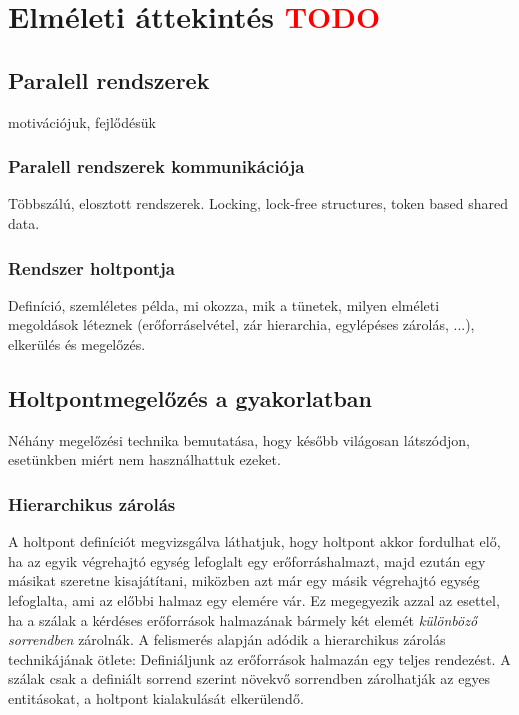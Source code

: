 \chapter{Elméleti áttekintés \textcolor{red}{TODO}}

\section{Paralell rendszerek} motivációjuk, fejlődésük %
    \subsection{Paralell rendszerek kommunikációja} 
        Többszálú, elosztott rendszerek. Locking, lock-free structures, token based shared data.
    \subsection{Rendszer holtpontja} Definíció, szemléletes példa, mi okozza, mik a tünetek, milyen elméleti megoldások léteznek (erőforráselvétel, zár hierarchia, egylépéses zárolás, ...), elkerülés és megelőzés.

\section{Holtpontmegelőzés a gyakorlatban} Néhány megelőzési technika bemutatása, hogy később világosan látszódjon, esetünkben miért nem használhattuk ezeket.

    \subsection{Hierarchikus zárolás} 
    A holtpont definíciót megvizsgálva láthatjuk, hogy holtpont akkor fordulhat elő, ha az egyik végrehajtó egység lefoglalt egy erőforráshalmazt, majd ezután egy másikat szeretne kisajátítani, miközben azt már egy másik végrehajtó egység lefoglalta, ami az előbbi halmaz egy elemére vár. Ez megegyezik azzal az esettel, ha a szálak a kérdéses erőforrások halmazának bármely két elemét \emph{különböző sorrendben} zárolnák. A felismerés alapján adódik a hierarchikus zárolás technikájának ötlete: Definiáljunk az erőforrások halmazán egy teljes rendezést. A szálak csak a definiált sorrend szerint növekvő sorrendben zárolhatják az egyes entitásokat, a holtpont kialakulását elkerülendő. 
    
